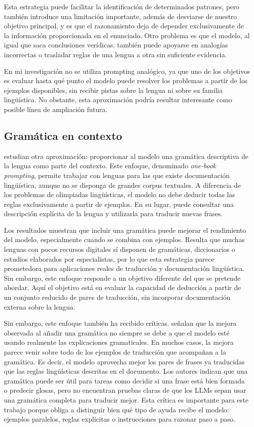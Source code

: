 Esta estrategia puede facilitar la identificación de determinados patrones, pero también introduce una limitación importante, además de desviarse de nuestro objetivo principal, y es que el razonamiento deja de depender exclusivamente de la información proporcionada en el enunciado. Otro problema es que el modelo, al igual que saca conclusiones verídicas, también puede apoyarse en analogías incorrectas o trasladar reglas de una lengua a otra sin suficiente evidencia.

En mi investigación no se utiliza prompting analógico, ya que uno de los objetivos es evaluar hasta qué punto el modelo puede resolver los problemas a partir de los ejemplos disponibles, sin recibir pistas sobre la lengua ni sobre su familia lingüística. No obstante, esta aproximación podría resultar interesante como posible línea de ampliación futura.

\subsection{Gramática en contexto}

\citet{tanzer2024benchmark} estudian otra aproximación: proporcionar al modelo una gramática descriptiva de la lengua como parte del contexto. Este enfoque, denominado \textit{one-book prompting}, permite trabajar con lenguas para las que existe documentación lingüística, aunque no se disponga de grandes corpus textuales. A diferencia de los problemas de olimpiadas lingüísticas, el modelo no debe deducir todas las reglas exclusivamente a partir de ejemplos. En su lugar, puede consultar una descripción explícita de la lengua y utilizarla para traducir nuevas frases.

Los resultados muestran que incluir una gramática puede mejorar el rendimiento del modelo, especialmente cuando se combina con ejemplos. Resulta que muchas lenguas con pocos recursos digitales sí disponen de gramáticas, diccionarios o estudios elaborados por especialistas, por lo que esta estrategia parece prometedora para aplicaciones reales de traducción y documentación lingüística. Sin embargo, este enfoque responde a un objetivo diferente del que se pretende abordar. Aquí el objetivo está en evaluar la capacidad de deducción a partir de un conjunto reducido de pares de traducción, sin incorporar documentación externa sobre la lengua.

Sin embargo, este enfoque también ha recibido críticas. \citet{aycock2025grammarbook} señalan que la mejora observada al añadir una gramática no siempre se debe a que el modelo esté usando realmente las explicaciones gramaticales. En muchos casos, la mejora parece venir sobre todo de los ejemplos de traducción que acompañan a la gramática. Es decir, el modelo aprovecha mejor los pares de frases ya traducidas que las reglas lingüísticas descritas en el documento. Los autores indican que una gramática puede ser útil para tareas como decidir si una frase está bien formada o predecir glosas, pero no encuentran pruebas claras de que los LLMs sepan usar una gramática completa para traducir mejor. Esta crítica es importante para este trabajo porque obliga a distinguir bien qué tipo de ayuda recibe el modelo: ejemplos paralelos, reglas explícitas o instrucciones para razonar paso a paso.

